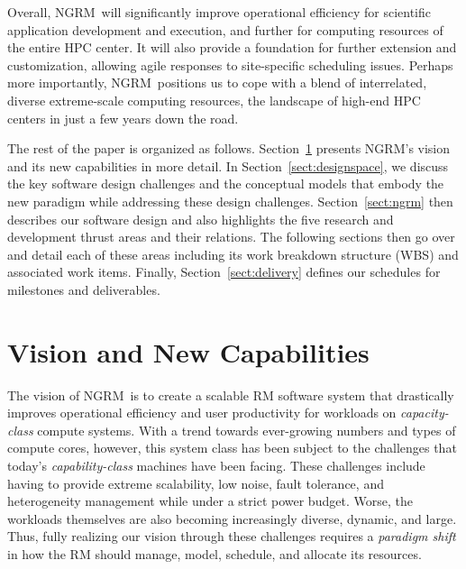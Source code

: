 \documentclass[10pt]{article}
\newcommand{\ngrm}{NGRM}
\begin{document}
Overall, \ngrm\ will significantly improve operational efficiency for
scientific application development and execution, and further for computing
resources of the entire HPC center.  It will also provide
a foundation for further extension and customization, allowing agile responses
to site-specific scheduling issues. Perhaps more importantly, \ngrm\
positions us to cope with a blend of interrelated, diverse
extreme-scale computing resources, the landscape of high-end HPC centers
in just a few years down the road.

The rest of the paper is organized as follows.
Section~\ref{sect:vision} presents \ngrm's vision and 
its new capabilities in more detail. 
In Section~\ref{sect:designspace}, we discuss 
the key software design challenges and the conceptual models
that embody the new paradigm while addressing these design challenges. 
Section~\ref{sect:ngrm} then describes our software design
and also highlights the five research and development thrust areas
and their relations. 
The following sections then go over and detail each of these areas including 
its work breakdown structure (WBS) and associated work items.
Finally, Section~\ref{sect:delivery} defines
our schedules for milestones and deliverables.


\section{Vision and New Capabilities}
\label{sect:vision}

The vision of \ngrm\ is to create a scalable RM software system that 
drastically improves operational efficiency and user productivity 
for workloads on {\em capacity-class} compute systems.
With a trend towards ever-growing numbers and types of compute cores, however,
this system class has been subject to the challenges that
today's {\em capability-class} machines have been facing. 
These challenges include having to provide extreme scalability, low noise, 
fault tolerance, and heterogeneity management while under a strict power budget.
Worse, the workloads themselves are also becoming increasingly diverse, 
dynamic, and large. Thus, fully realizing our vision through these challenges requires
a {\em paradigm shift} in how the RM should manage, model, schedule,
and allocate its resources.
\end{document}
